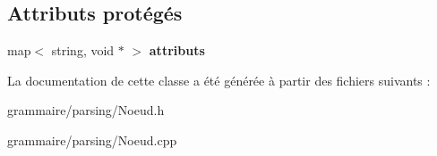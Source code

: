 \subsection*{Attributs protégés}
\begin{DoxyCompactItemize}
\item 
\hypertarget{class_noeud_a7eff1e9588e1ee40671ce7d8497db140}{map$<$ string, void $\ast$ $>$ {\bfseries attributs}}\label{class_noeud_a7eff1e9588e1ee40671ce7d8497db140}

\end{DoxyCompactItemize}


La documentation de cette classe a été générée à partir des fichiers suivants \-:\begin{DoxyCompactItemize}
\item 
grammaire/parsing/Noeud.\-h\item 
grammaire/parsing/Noeud.\-cpp\end{DoxyCompactItemize}
